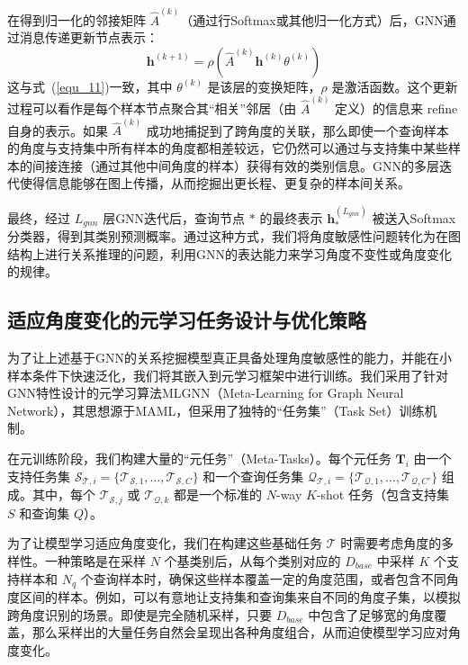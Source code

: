 在得到归一化的邻接矩阵 $\hat{A}^{(k)}$（通过行Softmax或其他归一化方式）后，GNN通过消息传递更新节点表示：
\begin{equation}
    \mathbf{h}^{(k+1)} = \rho(\hat{A}^{(k)} \mathbf{h}^{(k)} \theta^{(k)})
    \label{eq:gnn_update_angle}
\end{equation}
这与式~(\ref{equ_11})一致，其中 $\theta^{(k)}$ 是该层的变换矩阵，$\rho$ 是激活函数。这个更新过程可以看作是每个样本节点聚合其“相关”邻居（由 $\hat{A}^{(k)}$ 定义）的信息来 refine 自身的表示。如果 $\hat{A}^{(k)}$ 成功地捕捉到了跨角度的关联，那么即使一个查询样本的角度与支持集中所有样本的角度都相差较远，它仍然可以通过与支持集中某些样本的间接连接（通过其他中间角度的样本）获得有效的类别信息。GNN的多层迭代使得信息能够在图上传播，从而挖掘出更长程、更复杂的样本间关系。

最终，经过 $L_{gnn}$ 层GNN迭代后，查询节点 $*$ 的最终表示 $\mathbf{h}_*^{(L_{gnn})}$ 被送入Softmax分类器，得到其类别预测概率。通过这种方式，我们将角度敏感性问题转化为在图结构上进行关系推理的问题，利用GNN的表达能力来学习角度不变性或角度变化的规律。

\subsection{适应角度变化的元学习任务设计与优化策略}
\label{subsec:meta_learning_angle}

为了让上述基于GNN的关系挖掘模型真正具备处理角度敏感性的能力，并能在小样本条件下快速泛化，我们将其嵌入到元学习框架中进行训练。我们采用了针对GNN特性设计的元学习算法MLGNN（Meta-Learning for Graph Neural Network），其思想源于MAML，但采用了独特的“任务集”（Task Set）训练机制。

在元训练阶段，我们构建大量的“元任务”（Meta-Tasks）。每个元任务 $\mathbf{T}_i$ 由一个支持任务集 $\mathcal{S}_{\mathcal{T},i} = \{\mathcal{T}_{\mathcal{S},1}, \dots, \mathcal{T}_{\mathcal{S},C}\}$ 和一个查询任务集 $\mathcal{Q}_{\mathcal{T},i} = \{\mathcal{T}_{\mathcal{Q},1}, \dots, \mathcal{T}_{\mathcal{Q},C'}\}$ 组成。其中，每个 $\mathcal{T}_{\mathcal{S},j}$ 或 $\mathcal{T}_{\mathcal{Q},k}$ 都是一个标准的 $N$-way $K$-shot 任务（包含支持集 $S$ 和查询集 $Q$）。

为了让模型学习适应角度变化，我们在构建这些基础任务 $\mathcal{T}$ 时需要考虑角度的多样性。一种策略是在采样 $N$ 个基类别后，从每个类别对应的 $D_{base}$ 中采样 $K$ 个支持样本和 $N_q$ 个查询样本时，确保这些样本覆盖一定的角度范围，或者包含不同角度区间的样本。例如，可以有意地让支持集和查询集来自不同的角度子集，以模拟跨角度识别的场景。即使是完全随机采样，只要 $D_{base}$ 中包含了足够宽的角度覆盖，那么采样出的大量任务自然会呈现出各种角度组合，从而迫使模型学习应对角度变化。

